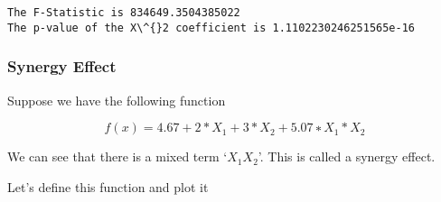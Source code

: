 \documentclass[11pt]{article}
\begin{document}
    \begin{Verbatim}[commandchars=\\\{\}]
The F-Statistic is 834649.3504385022
The p-value of the X\^{}2 coefficient is 1.1102230246251565e-16

    \end{Verbatim}

    \hypertarget{synergy-effect}{%
\subsubsection{Synergy Effect}\label{synergy-effect}}

Suppose we have the following function

\[f(x)=4.67+2*X_1+3*X_2+5.07∗X_1*X_2\]

We can see that there is a mixed term `\(X_1 X_2\)'. This is called a
synergy effect.

Let's define this function and plot it
\end{document}
